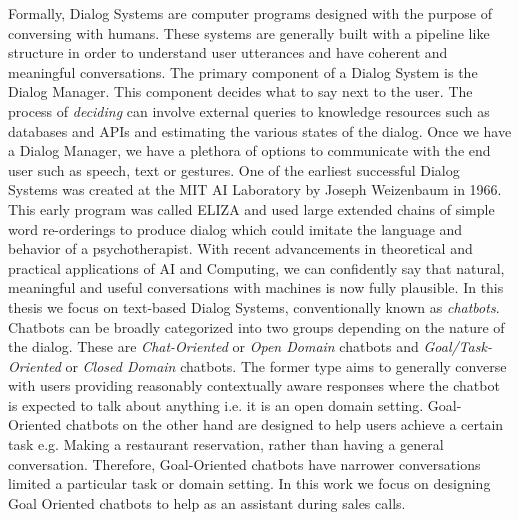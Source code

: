 \documentclass[14pt]{extarticle}
\numberwithin{equation}{section}
\begin{document}
	Formally, Dialog Systems are computer programs designed with the purpose of conversing with humans. These systems are generally built with a pipeline like structure in order to understand user utterances and have coherent and meaningful conversations. The primary component of a Dialog System is the Dialog Manager. This component decides what to say next to the user. The process of \textit{deciding} can involve external queries to knowledge resources such as databases and APIs and estimating the various states of the dialog. Once we have a Dialog Manager, we have a plethora of options to communicate with the end user such as speech, text or gestures.
	One of the earliest successful Dialog Systems was created at the MIT AI Laboratory by Joseph Weizenbaum in 1966. This early program was called ELIZA \cite{Weizenbaum:1966:ECP:365153.365168} and used large extended chains of simple word re-orderings to produce dialog which could imitate the language and behavior of a psychotherapist. With recent advancements in theoretical and practical applications of AI and Computing, we can confidently say that natural, meaningful and useful conversations with machines is now fully plausible. In this thesis we focus on text-based Dialog Systems, conventionally known as \textit{chatbots}. Chatbots can be broadly categorized into two groups depending on the nature of the dialog. These are \textit{Chat-Oriented} or \textit{Open Domain} chatbots and \textit{Goal/Task-Oriented} or \textit{Closed Domain} chatbots. The former type aims to generally converse with users providing reasonably contextually aware responses where the chatbot is expected to talk about anything i.e. it is an open domain setting. Goal-Oriented chatbots on the other hand are designed to help users achieve a certain task e.g. Making a restaurant reservation, rather than having a general conversation. Therefore, Goal-Oriented chatbots have narrower conversations limited a particular task or domain setting. In this work we focus on designing Goal Oriented chatbots to help as an assistant during sales calls.
\end{document}
